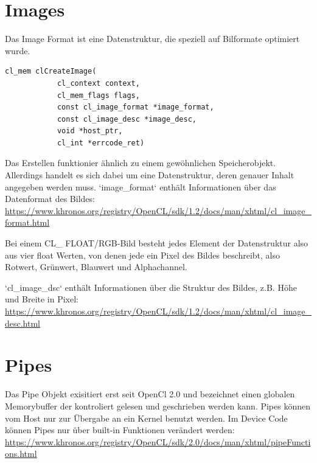 		\section{Images}
		Das Image Format ist eine Datenstruktur, die speziell auf Bilformate optimiert wurde.
		\begin{lstlisting}[caption=OpenCL Images]
		cl_mem clCreateImage(
			cl_context context, 
			cl_mem_flags flags,
			const cl_image_format *image_format,
			const cl_image_desc *image_desc,
			void *host_ptr,
			cl_int *errcode_ret)
		\end{lstlisting}	
			
		Das Erstellen funktionier ähnlich zu einem gewöhnlichen Speicherobjekt. Allerdings handelt es sich dabei um eine Datenstruktur, deren genauer Inhalt angegeben werden muss. \li`image_format` enthält Informationen über das Datenformat des Bildes: \url{https://www.khronos.org/registry/OpenCL/sdk/1.2/docs/man/xhtml/cl_image_format.html}
		
		Bei einem CL\_ FLOAT/RGB-Bild besteht jedes Element der Datenstruktur also aus vier float Werten, von denen jede ein Pixel des Bildes beschreibt, also Rotwert, Grünwert, Blauwert und Alphachannel.
		
		\li`cl_image_dsc` enthält Informationen über die Struktur des Bildes, z.B. Höhe und Breite in Pixel: \href{https://www.khronos.org/registry/OpenCL/sdk/1.2/docs/man/xhtml/cl_image_desc.html}{\small https://www.khronos.org/registry/OpenCL/sdk/1.2/docs/man/xhtml/cl{\_}image{\_}desc.html}
		
		\section{Pipes}
		Das Pipe Objekt exisitiert erst seit OpenCl 2.0 und bezeichnet einen globalen Memorybuffer der kontroliert gelesen und geschrieben werden kann. Pipes können vom Host nur zur Übergabe an ein \Gls{Kernel} benutzt werden. Im Device Code können Pipes nur über built-in Funktionen verändert werden: \url{https://www.khronos.org/registry/OpenCL/sdk/2.0/docs/man/xhtml/pipeFunctions.html}
		
